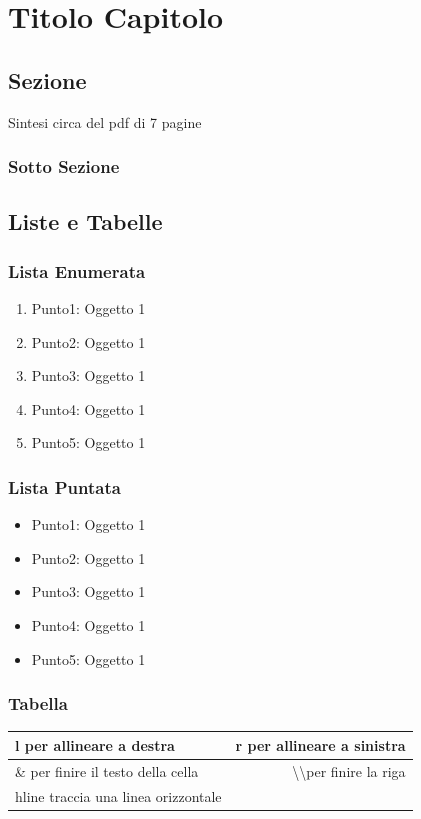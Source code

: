 \documentclass[openany,12pt,a4paper]{report}
\begin{document}
	
\chapter{Titolo Capitolo}

\section{Sezione}
\label{Sezione}
Sintesi circa del pdf di 7 pagine 
\subsection{Sotto Sezione}
\lipsum[20]


\section{Liste e Tabelle}
\lipsum[15]
\newpage

\subsection{Lista Enumerata}
\begin{enumerate}
	\item{Punto1:} Oggetto 1 
	\item{Punto2:} Oggetto 1 
	\item{Punto3:} Oggetto 1 
	\item{Punto4:} Oggetto 1 
	\item{Punto5:} Oggetto 1 
\end{enumerate}

\subsection{Lista Puntata}
\begin{itemize}
	\item{Punto1:} Oggetto 1 
	\item{Punto2:} Oggetto 1 
	\item{Punto3:} Oggetto 1 
	\item{Punto4:} Oggetto 1 
	\item{Punto5:} Oggetto 1 
\end{itemize}


\subsection{Tabella}
\begin{tabular}{ | l |  r | }
	\hline
	l per allineare a destra & r per allineare a sinistra \\
	\hline
	\& per finire il testo della cella  &\textbackslash\textbackslash per finire la riga \\
	\hline
	hline traccia una linea orizzontale \\
	\hline
	
\end{tabular}
\end{document}

